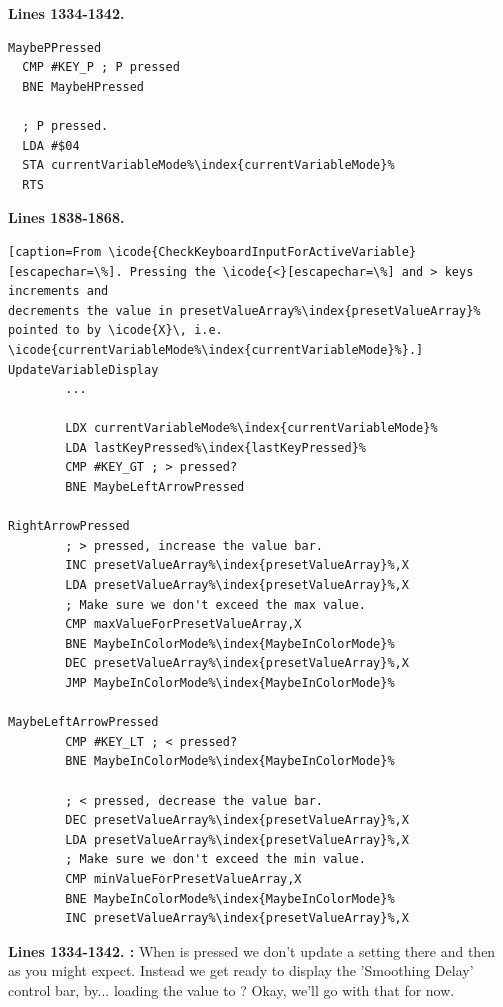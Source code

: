 \clearpage
\textbf{Lines 1334-1342. } 
\begin{lstlisting}[caption=From \icode{CheckKeyboardInput\index{CheckKeyboardInput}}.,escapechar=\%]
MaybePPressed   
  CMP #KEY_P ; P pressed
  BNE MaybeHPressed

  ; P pressed.
  LDA #$04
  STA currentVariableMode%\index{currentVariableMode}%
  RTS 
\end{lstlisting}
\textbf{Lines 1838-1868. } 
\begin{lstlisting}[escapechar=\%][caption=From \icode{CheckKeyboardInputForActiveVariable}[escapechar=\%]. Pressing the \icode{<}[escapechar=\%] and > keys increments and
decrements the value in presetValueArray%\index{presetValueArray}% pointed to by \icode{X}\, i.e. \icode{currentVariableMode%\index{currentVariableMode}%}.]
UpdateVariableDisplay   
        ...

        LDX currentVariableMode%\index{currentVariableMode}%
        LDA lastKeyPressed%\index{lastKeyPressed}%
        CMP #KEY_GT ; > pressed?
        BNE MaybeLeftArrowPressed

RightArrowPressed
        ; > pressed, increase the value bar.
        INC presetValueArray%\index{presetValueArray}%,X
        LDA presetValueArray%\index{presetValueArray}%,X
        ; Make sure we don't exceed the max value.
        CMP maxValueForPresetValueArray,X
        BNE MaybeInColorMode%\index{MaybeInColorMode}%
        DEC presetValueArray%\index{presetValueArray}%,X
        JMP MaybeInColorMode%\index{MaybeInColorMode}%

MaybeLeftArrowPressed   
        CMP #KEY_LT ; < pressed?
        BNE MaybeInColorMode%\index{MaybeInColorMode}%

        ; < pressed, decrease the value bar.
        DEC presetValueArray%\index{presetValueArray}%,X
        LDA presetValueArray%\index{presetValueArray}%,X
        ; Make sure we don't exceed the min value.
        CMP minValueForPresetValueArray,X
        BNE MaybeInColorMode%\index{MaybeInColorMode}%
        INC presetValueArray%\index{presetValueArray}%,X
\end{lstlisting}
\clearpage

\textbf{Lines 1334-1342. :} When  is pressed we don't
update a setting there and then as you might expect. Instead we get ready to display the 'Smoothing
Delay' control bar, by... loading the value  to ? Okay, we'll
go with that for now.

